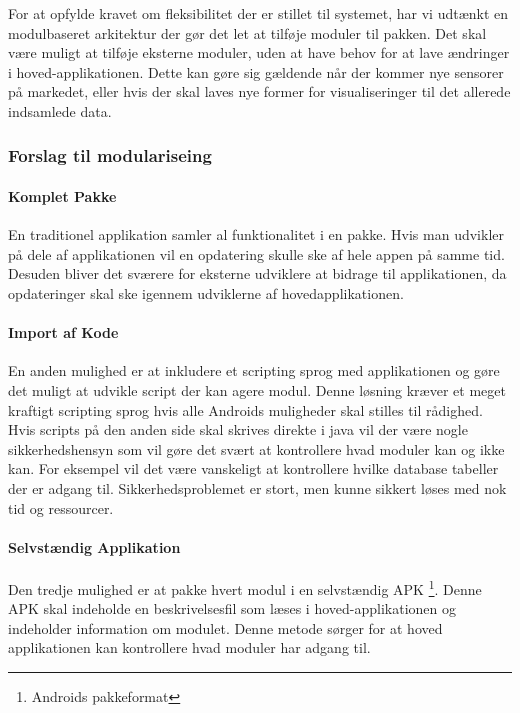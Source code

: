 
For at opfylde kravet om fleksibilitet der er stillet til systemet, har vi udtænkt en modulbaseret arkitektur der gør det let at tilføje moduler til pakken.
Det skal være muligt at tilføje eksterne moduler, uden at have behov for at lave ændringer i hoved-applikationen.
Dette kan gøre sig gældende når der kommer nye sensorer på markedet, eller hvis der skal laves nye former for visualiseringer til det allerede indsamlede data.
\subsubsection{Forslag til modulariseing}
\paragraph{Komplet Pakke}
En traditionel applikation samler al funktionalitet i en pakke.
Hvis man udvikler på dele af applikationen vil en opdatering skulle ske af hele appen på samme tid.
Desuden bliver det sværere for eksterne udviklere at bidrage til applikationen, da opdateringer skal ske igennem udviklerne af hovedapplikationen.

\paragraph{Import af Kode}
En anden mulighed er at inkludere et scripting sprog med applikationen og gøre det muligt at udvikle script der kan agere modul.
Denne løsning kræver et meget kraftigt scripting sprog hvis alle Androids muligheder skal stilles til rådighed.
Hvis scripts på den anden side skal skrives direkte i java vil der være nogle sikkerhedshensyn som vil gøre det svært at kontrollere hvad moduler kan og ikke kan.
For eksempel vil det være vanskeligt at kontrollere hvilke database tabeller der er adgang til.
Sikkerhedsproblemet er stort, men kunne sikkert løses med nok tid og ressourcer.

\paragraph{Selvstændig Applikation}
Den tredje mulighed er at pakke hvert modul i en selvstændig APK \footnote{Androids pakkeformat}.
Denne APK skal indeholde en beskrivelsesfil som læses i hoved-applikationen og indeholder information om modulet.
Denne metode sørger for at hoved applikationen kan kontrollere hvad moduler har adgang til. 

